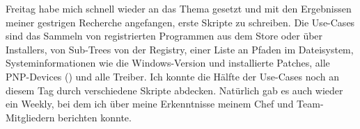 \sweekdaymarginpar{\weekdayFridayLong}

Freitag habe mich schnell wieder an das Thema gesetzt und mit den Ergebnissen meiner gestrigen Recherche angefangen, erste Skripte zu schreiben.
Die Use-Cases sind das Sammeln von registrierten Programmen aus dem Store oder über Installers, von Sub-Trees von der Registry, einer Liste an Pfaden im Dateisystem, Systeminformationen wie die Windows-Version und installierte Patches, alle PNP-Devices () und alle Treiber.
Ich konnte die Hälfte der Use-Cases noch an diesem Tag durch verschiedene Skripte abdecken.
Natürlich gab es auch wieder ein Weekly, bei dem ich über meine Erkenntnisse meinem Chef und Team-Mitgliedern berichten konnte.
